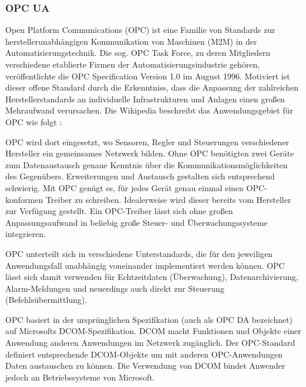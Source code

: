 \subsubsection{OPC UA%
        \label{sec:2-opcua}}

Open Platform Communications (OPC) ist eine Familie von Standards zur herstellerunabhängigen
Kommunikation von Maschinen (M2M) in der Automatisierungstechnik. Die sog. OPC Task Force, zu deren
Mitgliedern verschiedene etablierte Firmen der Automatisierungsindustrie gehören, veröffentlichte
die OPC Specification Version 1.0 im August 1996.
Motiviert ist dieser offene Standard durch die Erkenntniss, dass die Anpassung der
zahlreichen Herstellerstandards an individuelle Infrastrukturen und Anlagen einen
großen Mehraufwand verursachen.
Die Wikipedia beschreibt das Anwendungsgebiet für OPC wie folgt \citep[vgl.][]{web-wiki-opc}:

\glqq{}OPC wird dort eingesetzt, wo Sensoren, Regler und Steuerungen verschiedener Hersteller
ein gemeinsames Netzwerk bilden. Ohne OPC benötigten zwei Geräte zum Datenaustausch
genaue Kenntnis über die Kommunikationsmöglichkeiten des Gegenübers. Erweiterungen
und Austausch gestalten sich entsprechend schwierig. Mit OPC genügt es, für jedes
Gerät genau einmal einen OPC-konformen Treiber zu schreiben. Idealerweise wird
dieser bereits vom Hersteller zur Verfügung gestellt. Ein OPC-Treiber lässt sich
ohne großen Anpassungsaufwand in beliebig große Steuer- und Überwachungssysteme
integrieren.

OPC unterteilt sich in verschiedene Unterstandards, die für den jeweiligen Anwendungsfall
unabhängig voneinander implementiert werden können. OPC lässt sich damit verwenden
für Echtzeitdaten (Überwachung), Datenarchivierung, Alarm-Meldungen und neuerdings
auch direkt zur Steuerung (Befehlsübermittlung).\grqq{}

OPC basiert in der ursprünglichen Spezifikation (auch als OPC DA bezeichnet) auf Microsofts DCOM-Spezifikation.
DCOM macht Funktionen und Objekte einer Anwendung anderen Anwendungen im Netzwerk
zugänglich. Der OPC-Standard definiert entsprechende DCOM-Objekte um mit anderen
OPC-Anwendungen Daten austauschen zu können. Die Verwendung von DCOM bindet Anwender
jedoch an Betriebssysteme von Microsoft. 

